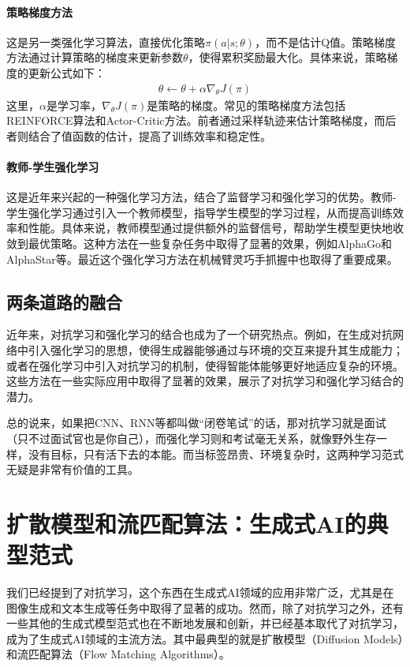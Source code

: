 \paragraph{策略梯度方法} 这是另一类强化学习算法，直接优化策略$\pi(a|s; \theta)$，而不是估计Q值。策略梯度方法通过计算策略的梯度来更新参数$\theta$，使得累积奖励最大化。具体来说，策略梯度的更新公式如下：
\begin{align*}
\theta \leftarrow \theta + \alpha \nabla_\theta J(\pi)
\end{align*}
这里，$\alpha$是学习率，$\nabla_\theta J(\pi)$是策略的梯度。常见的策略梯度方法包括REINFORCE算法和Actor-Critic方法。前者通过采样轨迹来估计策略梯度，而后者则结合了值函数的估计，提高了训练效率和稳定性。

\paragraph{教师-学生强化学习} 这是近年来兴起的一种强化学习方法，结合了监督学习和强化学习的优势。教师-学生强化学习通过引入一个教师模型，指导学生模型的学习过程，从而提高训练效率和性能。具体来说，教师模型通过提供额外的监督信号，帮助学生模型更快地收敛到最优策略。这种方法在一些复杂任务中取得了显著的效果，例如AlphaGo和AlphaStar等。最近这个强化学习方法在机械臂灵巧手抓握中也取得了重要成果。

\subsection{两条道路的融合}

近年来，对抗学习和强化学习的结合也成为了一个研究热点。例如，在生成对抗网络中引入强化学习的思想，使得生成器能够通过与环境的交互来提升其生成能力；或者在强化学习中引入对抗学习的机制，使得智能体能够更好地适应复杂的环境。这些方法在一些实际应用中取得了显著的效果，展示了对抗学习和强化学习结合的潜力。

总的说来，如果把CNN、RNN等都叫做“闭卷笔试”的话，那对抗学习就是面试（只不过面试官也是你自己），而强化学习则和考试毫无关系，就像野外生存一样，没有目标，只有活下去的本能。而当标签昂贵、环境复杂时，这两种学习范式无疑是非常有价值的工具。

\section{扩散模型和流匹配算法：生成式AI的典型范式}

我们已经提到了对抗学习，这个东西在生成式AI领域的应用非常广泛，尤其是在图像生成和文本生成等任务中取得了显著的成功。然而，除了对抗学习之外，还有一些其他的生成式模型范式也在不断地发展和创新，并已经基本取代了对抗学习，成为了生成式AI领域的主流方法。其中最典型的就是扩散模型（Diffusion Models）和流匹配算法（Flow Matching Algorithms）。

